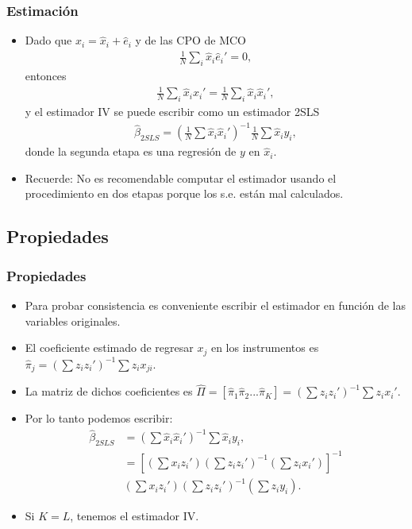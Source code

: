 \documentclass[t, compress, spanish, aspectratio=169]{beamer}
\begin{document}
\begin{frame}
    \frametitle{Estimaci\'on}
    \vspace*{-0.6em}
    \small
    \begin{itemize}
    \item Dado que $x_i = \hat x_i + \hat e_i$ y de las CPO de MCO
        \begin{align*}
        \frac{1}{N}\sum_i \hat x_i \hat e_i'=0,
        \end{align*}
        entonces
        \begin{align*}
        \frac{1}{N}\sum_i \hat x_i x_i'=\frac{1}{N}\sum_i \hat x_i \hat x_i',
        \end{align*}
        y el estimador IV se puede escribir como un estimador 2SLS
            \begin{align*}
                \hat \beta_{2SLS} 
                =\left(
                \frac{1}{N} \sum \hat x_i \hat x_i'
                \right)^{-1}\frac{1}{N}\sum \hat x_i y_i,
            \end{align*}
            donde la segunda etapa es una regresi\'on de $y$ en $\hat x_i$.
            \item Recuerde: No es recomendable computar el estimador usando el procedimiento en dos etapas porque los s.e. est\'an mal calculados.
    \end{itemize}
\end{frame}
\subsection{Propiedades}
\begin{frame}
    \frametitle{Propiedades}
    \small
    \begin{itemize} 
    	\item Para probar consistencia es conveniente escribir el estimador en funci\'on de las variables originales.
    	\item El coeficiente estimado de regresar $x_j$ en los instrumentos es  $\hat \pi_j=\left(\sum z_i z_i'\right)^{-1} \sum z_i x_{ji}$.
    	\item La matriz de dichos coeficientes es $\hat \Pi=[\hat \pi_1 \hat \pi_2 ... \hat \pi_K]=\left(\sum z_i z_i'\right)^{-1} \sum z_i x_{i}'$.
    	\item Por lo tanto podemos escribir:
        \begin{align*}
            \hat \beta_{2SLS} &=\left(
                            \sum \hat x_i \hat x_i'
                            \right)^{-1}\sum \hat x_i y_i,\\
            &=\left[\left(\sum x_i z_i'\right)\left(\sum z_i z_i'\right)^{-1}\left(\sum z_i x_i'\right) \right]^{-1}\\
            &
            \left(\sum x_i z_i'\right)\left(\sum z_i z_i'\right)^{-1}\left(\sum z_i y_i\right).
        \end{align*}
        \item Si $K=L$, tenemos el estimador IV.
    \end{itemize}
\end{frame}
\end{document}
